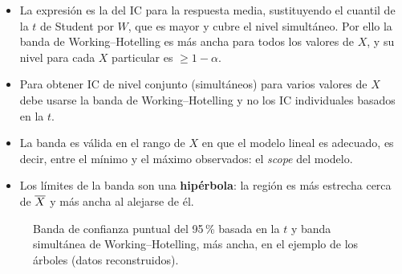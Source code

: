 \begin{itemize}
  \item La expresión es la del IC para la respuesta media, sustituyendo el cuantil de la $t$ de
    Student por $W$, que es mayor y cubre el nivel simultáneo. Por ello la banda de
    Working--Hotelling es más ancha para todos los valores de $X$, y su nivel para cada $X$
    particular es $\ge1-\alpha$.
  \item Para obtener IC de nivel conjunto (simultáneos) para varios valores de $X$ debe usarse
    la banda de Working--Hotelling y no los IC individuales basados en la $t$.
  \item La banda es válida en el rango de $X$ en que el modelo lineal es adecuado, es decir,
    entre el mínimo y el máximo observados: el \emph{scope} del modelo.
  \item Los límites de la banda son una \textbf{hipérbola}: la región es más estrecha cerca de
    $\overline{X}$ y más ancha al alejarse de él.
\end{itemize}

\begin{figure}[H]
  \centering
  \caption{Banda de confianza puntual del 95\,\% basada en la $t$ y banda simultánea de
    Working--Hotelling, más ancha, en el ejemplo de los árboles (datos reconstruidos).}
\end{figure}

